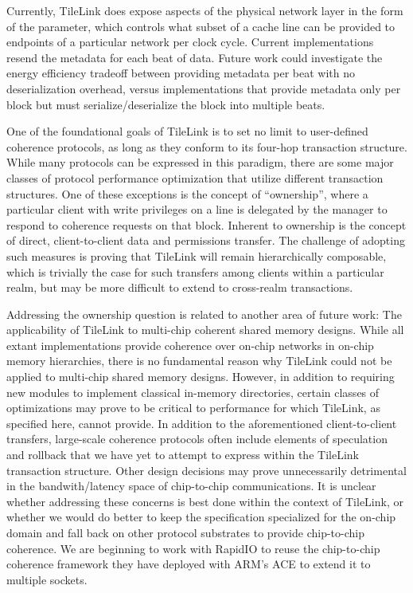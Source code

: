 Currently, TileLink does expose aspects of the physical network layer in the form of the  parameter, which
controls what subset of a cache line can be provided to endpoints of a particular network per clock cycle.
Current implementations resend the metadata for each beat of data.
Future work could investigate the energy efficiency tradeoff between providing metadata per beat with no deserialization overhead,
versus implementations that provide metadata only per block but must serialize/deserialize the block into multiple beats. 

One of the foundational goals of TileLink is to set no limit to user-defined coherence protocols, as long as they conform to
its four-hop transaction structure.
While many protocols can be expressed in this paradigm, there are some major classes of protocol performance optimization that
utilize different transaction structures.
One of these exceptions is the concept of ``ownership'', where a particular client with write privileges on a line is delegated by the manager
to respond to coherence requests on that block.
Inherent to ownership is the concept of direct, client-to-client data and permissions transfer.
The challenge of adopting such measures is proving that TileLink will remain hierarchically composable,
which is trivially the case for such transfers among clients within a particular realm,
but may be more difficult to extend to cross-realm transactions.

Addressing the ownership question is related to another area of future work:
The applicability of TileLink to multi-chip coherent shared memory designs.
While all extant implementations provide coherence over on-chip networks in on-chip memory hierarchies,
there is no fundamental reason why TileLink could not be applied to multi-chip shared memory designs.
However, in addition to requiring new modules to implement classical in-memory directories,
certain classes of optimizations may prove to be critical to performance for which TileLink, as specified here, cannot provide.
In addition to the aforementioned client-to-client transfers, large-scale coherence protocols often include
elements of speculation and rollback that we have yet to attempt to express within the TileLink transaction structure.
Other design decisions may prove unnecessarily detrimental in the bandwith/latency space of chip-to-chip communications.
It is unclear whether addressing these concerns is best done within the context of TileLink, or whether we would
do better to keep the specification specialized for the on-chip domain and fall back on other
protocol substrates to provide chip-to-chip coherence.
We are beginning to work with RapidIO to reuse the chip-to-chip coherence framework
they have deployed with ARM's ACE to extend it to multiple sockets.

